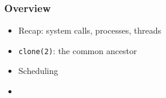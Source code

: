 \begin{frame}

\frametitle{Overview}

\begin{itemize}

\item Recap: system calls, processes, threads

\item \texttt{clone(2)}: the common ancestor

\item Scheduling

\item \kudos{}

\end{itemize}

\end{frame}
